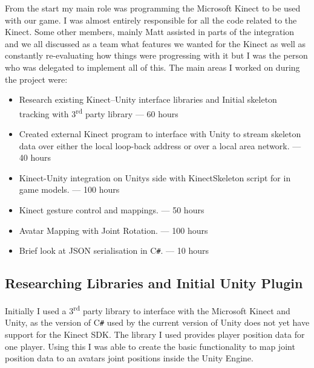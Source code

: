 \documentclass[a4paper,oneside]{memoir}
\begin{document}
			From the start my main role was programming the Microsoft Kinect to be used with our game.
			I was almost entirely responsible for all the code related to the Kinect. Some other members, mainly Matt assisted in parts of the integration and we all discussed as a team what features we wanted for the Kinect as well as constantly re-evaluating how things were progressing with it but I was the person who was delegated to implement all of this. The main areas I worked on during the project were:

			\begin{itemize}
				\item Research existing Kinect--Unity interface libraries and Initial skeleton tracking with 3\textsuperscript{rd} party library\cite{Kinect::Adevine1618} --- 60 hours
				\item Created external Kinect program to interface with Unity to stream skeleton data over either the local loop-back address or over a local area network. --- 40 hours
				\item Kinect-Unity integration on Unitys side with KinectSkeleton script for in game models. --- 100 hours
				\item Kinect gesture control and mappings. --- 50 hours
				\item Avatar Mapping with Joint Rotation. --- 100 hours
				\item Brief look at JSON serialisation in C\texttt{\#}. --- 10 hours
			\end{itemize}

			\subsection{Researching Libraries and Initial Unity Plugin}


				Initially I used a 3\textsuperscript{rd} party library to interface with the Microsoft Kinect and Unity, as the version of C\texttt{\#} used by the current version of Unity does not yet have support for the Kinect SDK. The library I used provides player position data for one player. Using this I was able to create the basic functionality to map joint position data to an avatars joint positions inside the Unity Engine.
\end{document}
